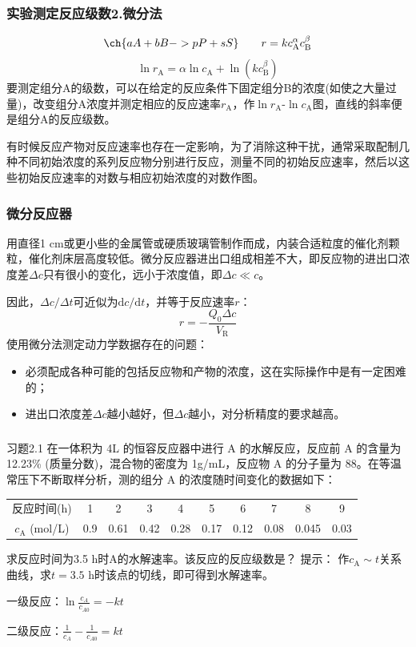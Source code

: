 \begin{frame}
    \frametitle{实验测定反应级数\quad 2.微分法}
        \[
        \ch{a A + b B -> p P + s S} \qquad r=kc_\mathrm{A}^{\alpha}c_\mathrm{B}^{\beta}
        \]
        \[
            \ln r_{\mathrm{A}}=\alpha\ln c_{\mathrm{A}}+\ln(kc_{\mathrm{B}}^{\beta})
        \]
        要测定组分A的级数，可以在给定的反应条件下固定组分B的浓度(如使之大量过量)，改变组分A浓度并测定相应的反应速率$r_\mathrm{A}$，作$\ln r_{\mathrm{A}}$-$\ln c_{\mathrm{A}}$图，直线的斜率便是组分A的反应级数。

        有时候反应产物对反应速率也存在一定影响，为了消除这种干扰，通常采取配制几种不同初始浓度的系列反应物分别进行反应，测量不同的初始反应速率，然后以这些初始反应速率的对数与相应初始浓度的对数作图。
\end{frame}


\begin{frame}
    \frametitle{微分反应器}
    用直径1 cm或更小些的金属管或硬质玻璃管制作而成，内装合适粒度的催化剂颗粒，催化剂床层高度较低。微分反应器进出口组成相差不大，即反应物的进出口浓度差$\Delta c$只有很小的变化，远小于浓度值，即$\Delta c \ll  c$。

    因此，$\Delta c / \Delta t$可近似为$\mathrm{d}c/\mathrm{d}t$，并等于反应速率$r$：
    \[
        r = - \frac{Q_0 \Delta c}{V_\mathrm{R}}
    \]
    使用微分法测定动力学数据存在的问题：
    \begin{itemize}
      \item 必须配成各种可能的包括反应物和产物的浓度，这在实际操作中是有一定困难的；
      \item 进出口浓度差$\Delta c$越小越好，但$\Delta c$越小，对分析精度的要求越高。
    \end{itemize}
\end{frame}


\begin{frame}[t]
    \frametitle{}
    \begin{block}{习题2.1}
        在一体积为 4L 的恒容反应器中进行 A 的水解反应，反应前 A 的含量为12.23\% (质量分数)，混合物的密度为 1g/mL，反应物 A 的分子量为 88。在等温常压下不断取样分析，测的组分 A 的浓度随时间变化的数据如下：
        \begin{table}[]
            \begin{tabular}{cccccccccc}
            反应时间(h)    & 1   & 2    & 3    & 4    & 5    & 6    & 7    & 8     & 9    \\
            $c_\mathrm{A}$ (mol/L) & 0.9 & 0.61 & 0.42 & 0.28 & 0.17 & 0.12 & 0.08 & 0.045 & 0.03
            \end{tabular}
        \end{table}
        求反应时间为3.5 h时A的水解速率。该反应的反应级数是？
        \tcblower
    提示： 作$c_\mathrm{A}\sim t$关系曲线，求$t = 3.5$ h时该点的切线，即可得到水解速率。

    一级反应：$\ln \frac{c_A}{c_{A0}} = -kt$
    
    二级反应：$\frac{1}{c_{A}} - \frac{1}{c_{A0}} = kt$
    \end{block}
    
\end{frame}


